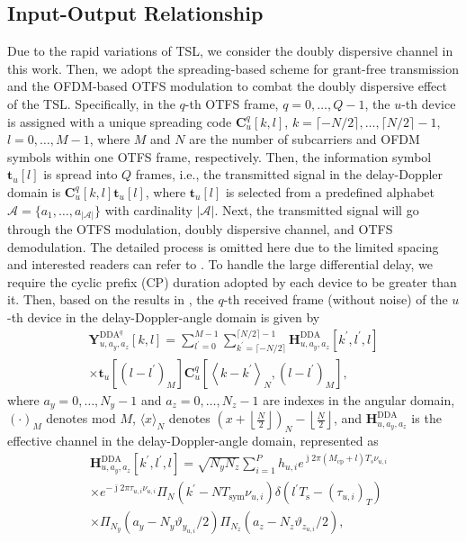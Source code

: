 \documentclass[conference]{IEEEtran}
\begin{document}
	\subsection{Input-Output Relationship}
	Due to the rapid variations of TSL, we consider the doubly dispersive channel \cite{g1} in this work. Then, we adopt the spreading-based scheme \cite{Joint1} \cite{Joint2} for grant-free transmission and the OFDM-based OTFS modulation to combat the doubly dispersive effect of the TSL. Specifically, in the $q$-th OTFS frame, $q=0,\dots,Q-1$, the $u$-th device is assigned with a unique spreading code $\mathbf C_u^q[k,l]$, $k=\lceil -N/2\rceil,\dots,\lceil N/2\rceil-1$, $l=0,\dots,M-1$, where $M$ and $N$ are the number of subcarriers and OFDM symbols within one OTFS frame, respectively. Then, the information symbol $\mathbf t_u[l]$ is spread into $Q$ frames, i.e., the transmitted signal in the delay-Doppler domain is $\mathbf C_u^q[k,l] \mathbf t_u[l]$, where $\mathbf t_u[l]$ is selected from a predefined alphabet $\mathcal{A} = \{a_1, \dots, a_{\left|\mathcal{A}\right|}\}$ with cardinality $\left|\mathcal{A}\right|$. Next, the transmitted signal will go through the OTFS modulation, doubly dispersive channel, and OTFS demodulation. The detailed process is omitted here due to the limited spacing and interested readers can refer to \cite{s22,smm1}. To handle the large differential delay, we require the cyclic prefix (CP) duration adopted by each device to be greater than it. Then, based on the results in \cite{smm1}, the $q$-th received frame (without noise) of the $u$-th device in the delay-Doppler-angle domain is given by
	\begin{align}
	\label{ryDDA}
	\mathbf Y_{u,a_y, a_z}^{\mathrm{DDA}^q}[k, l] =\sum_{l^{\prime}=0}^{M-1} \sum_{k^{\prime}=\lceil-N / 2\rceil}^{\lceil N / 2\rceil-1} 
	\mathbf H_{u, a_y,a_z}^{\mathrm{DDA}}\left[k^{\prime}, l^{\prime}, l\right] \nonumber \\
	\times \mathbf t_u\left[\left(l-l^{\prime}\right)_{M}\right] 
	\mathbf C_u^q\left[\left\langle k-k^{\prime}\right\rangle_{N},\left(l-l^{\prime}\right)_{M}\right],
	\end{align}   
	where $a_y = 0,\dots,N_y-1$ and $a_z = 0,\dots,N_z-1$ are indexes in the angular domain, $(\cdot)_{M}$ denotes mod $M$, $\langle x\rangle_{N}$ denotes $\left(x+\left\lfloor\frac{N}{2}\right\rfloor\right)_{N}-\left\lfloor\frac{N}{2}\right\rfloor$, and $\mathbf H_{u,a_y,a_z}^{\mathrm{DDA}}$ is the effective channel in the delay-Doppler-angle domain, represented as
    \begin{align}
    	\label{angleD}
    	&\mathbf H_{u, a_y,a_z}^{\mathrm{DDA}}[k^{\prime}, l^{\prime}, l] 
    	=\sqrt{N_yN_z}\sum_{i=1}^{P}h_{u,i} e^{\bar{\jmath} 2 \pi(M_{\text{cp}} + l)T_s\nu_{u,i}} \nonumber \\
    	&\times e^{-\bar{\jmath} 2 \pi\tau_{u,i}\nu_{u,i}} \Pi_N(k^{\prime}-NT_{\text{sym}}\nu_{u,i})\delta\left(l^{\prime} T_{\mathrm{s}}-(\tau_{u,i})_T\right)\nonumber\\  &\times\Pi_{N_y}(a_y-N_y\vartheta_{y_{u,i}}/2) \Pi_{N_z}(a_z-N_z\vartheta_{z_{u,i}}/2),
    \end{align}
\end{document}
